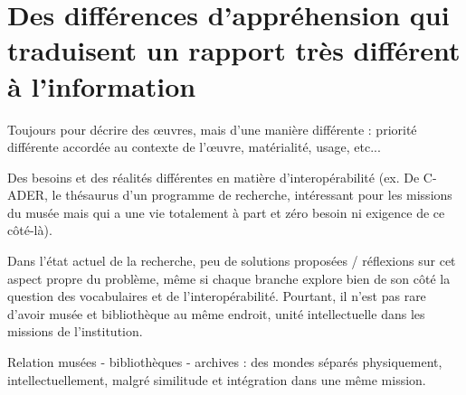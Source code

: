 \section{\label{II-B-2}Des différences d’appréhension qui traduisent un rapport très différent à l’information}

Toujours pour décrire des œuvres, mais d’une manière différente : priorité différente accordée au contexte de l’œuvre, matérialité, usage, etc... 

Des besoins et des réalités différentes en matière d’interopérabilité (ex. De C-ADER, le thésaurus d’un programme de recherche, intéressant pour les missions du musée mais qui a une vie totalement à part et zéro besoin ni exigence de ce côté-là). 

Dans l’état actuel de la recherche, peu de solutions proposées / réflexions sur cet aspect propre du problème, même si chaque branche explore bien de son côté la question des vocabulaires et de l’interopérabilité. Pourtant, il n’est pas rare d’avoir musée et bibliothèque au même endroit, unité intellectuelle dans les missions de l’institution. 

Relation musées - bibliothèques - archives : des mondes séparés physiquement, intellectuellement, malgré similitude et intégration dans une même mission.